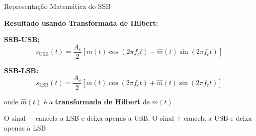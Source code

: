 \begin{frame}{Representação Matemática do SSB}

\textbf{Resultado usando Transformada de Hilbert:}

\vspace{0.3cm}

\textbf{SSB-USB:}
\[
\boxed{s_{\text{USB}}(t) = \frac{A_c}{2}[m(t)\cos(2\pi f_c t) - \hat{m}(t)\sin(2\pi f_c t)]}
\]

\textbf{SSB-LSB:}
\[
\boxed{s_{\text{LSB}}(t) = \frac{A_c}{2}[m(t)\cos(2\pi f_c t) + \hat{m}(t)\sin(2\pi f_c t)]}
\]

onde $\hat{m}(t)$ é a \textbf{transformada de Hilbert} de $m(t)$

\vspace{0.2cm}

O sinal $-$ cancela a LSB e deixa apenas a USB. O sinal $+$ cancela a USB e deixa apenas a LSB

\end{frame}


